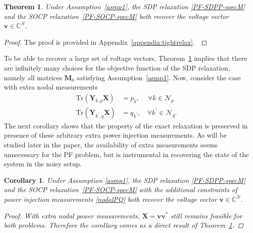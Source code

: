 \documentclass[journal,twoside]{IEEEtran}
\newtheorem{theorem}{Theorem}
\newtheorem{corollary}{Corollary}
\newcommand{\Tr}{\mathrm{Tr}}
\newcommand{\bv}{\mathbf{v}}
\newcommand{\bH}{\mathbf{H}}
\newcommand{\bM}{\mathbf{M}}
\newcommand{\bX}{\mathbf{X}}
\newcommand{\bY}{\mathbf{Y}}
\newcommand{\cN}{{\mathcal N}}
\begin{document}
\begin{theorem}
\label{thm:tightrelax}
Under Assumption~\ref{asmp1}, the SDP relaxation \eqref{PF-SDPP-specM} and the  SOCP relaxation~\eqref{PF-SOCP-specM} both recover the voltage vector $\bv \in \mathbb{C}^N$.
\end{theorem}
\begin{proof}
The proof  is provided in  Appendix~\ref{appendix:tightrelax}.~\end{proof}
To be able to recover a large set of voltage vectors, Theorem~\ref{thm:tightrelax} implies that there are infinitely many choices for the objective function of the SDP relaxation, namely all matrices $\bM_0$ satisfying Assumption~\ref{asmp1}. Now, consider the case with  extra nodal measurements
\begin{subequations}\label{nodalPQ}
\begin{align}
\Tr(\bY_{k,p}\bX) &= p_k, \quad\ \forall k\in \cN_p \\
\Tr(\bY_{k^{\prime},q}\bX) &= q_{k^\prime}, \quad \forall k^{\prime}\in \cN_q.
\end{align}
\end{subequations}
The next corollary shows that the property of the exact relaxation is preserved in presence of
these arbitrary extra power injection measurements. As will be studied later in the paper, the availability of extra measurements seems unnecessary for the PF problem, but  is instrumental in recovering the state of the system in the noisy setup.

\begin{corollary}
\label{coro:nodalM}
Under Assumption \ref{asmp1}, the SDP relaxation \eqref{PF-SDPP-specM} and the SOCP relaxation~\eqref{PF-SOCP-specM} with the
additional constraints of power injection measurements \eqref{nodalPQ}
both recover the voltage vector $\bv \in \mathbb{C}^N$.
\begin{proof}
With extra nodal power measurements, $\mathbf{X}=\mathbf{v}\mathbf{v}^{\ast}$ still remains feasible for both problems. Therefore the corollary comes as a direct result of Theorem~\ref{thm:tightrelax}.
\end{proof}
\end{corollary}
\end{document}
